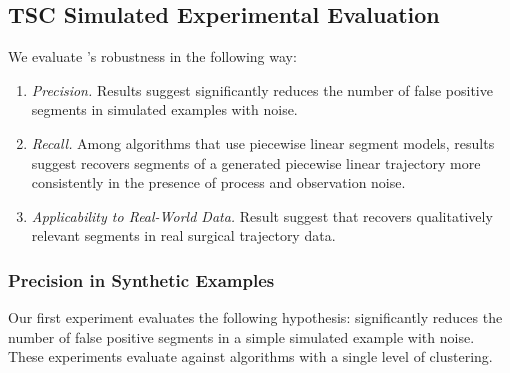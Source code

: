 \subsection{TSC Simulated Experimental Evaluation}
 We evaluate \tsc's robustness in the following way:
\begin{enumerate}
   \item \emph{Precision. } Results suggest \tsc significantly reduces the number of false positive segments in simulated examples with noise.
   \item \emph{Recall. } Among algorithms that use piecewise linear segment models, results suggest \tsc recovers segments of a generated piecewise linear trajectory more consistently in the presence of process and observation noise.
   \item \emph{Applicability to Real-World Data. } Result suggest that \tsc recovers qualitatively relevant segments in real surgical trajectory data.
\end{enumerate}

\subsubsection{Precision in Synthetic Examples}
Our first experiment evaluates the following hypothesis: \tsc significantly reduces the number of false positive segments in a simple simulated example with noise. These experiments evaluate \tsc against algorithms with a single level of clustering.

